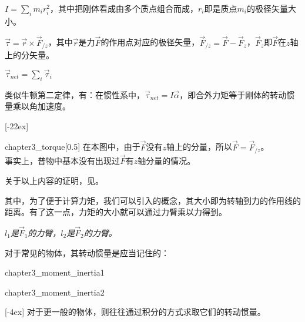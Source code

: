 \begin{Itemize}
	\item {} $\displaystyle I=\sum_{i}m_ir_i^2$，其中把刚体看成由多个质点组合而成，$r_i$即是质点$m_i$的极径矢量大小。
	
	\item {} $\vec{\tau}=\vec{r}\times\vec{F}_{/z}$，其中$\vec{r}$是力$\vec{F}$的作用点对应的极径矢量，$\vec{F}_{/z}=\vec{F}-\vec{F}_z$，$\vec{F}_z$即$\vec{F}$在$z$轴上的分矢量\footnotemark。
	\item {} $\displaystyle\vec{\tau}_{net}=\sum_{i}\vec{\tau}_i$
	\item 类似牛顿第二定律，有：在惯性系中，$\vec{\tau}_{net}=I\vec{\alpha}$，即合外力矩等于刚体的转动惯量乘以角加速度。
\end{Itemize}
[-22ex]
\clearpage
\begin{singlefigure}[力矩示意图]{chapter3_torque}[0.5]
	在本图中，由于$\vec{F}$没有$z$轴上的分量，所以$\vec{F}=\vec{F}_{/z}$。\\
	事实上，普物中基本没有出现过$\vec{F}$有$z$轴分量的情况。
\end{singlefigure}
关于以上内容的证明，见。

其中，为了便于计算力矩，我们可以引入的概念，其大小即为转轴到力的作用线的距离。有了这一点，力矩的大小就可以通过力臂乘以力得到。
\begin{center}
	\em $l_1$是$\vec{F}_1$的力臂，$l_2$是$\vec{F}_2$的力臂。
\end{center}

对于常见的物体，其转动惯量是应当记住的：
\begin{singlefigure}{chapter3_moment_inertia1}
\end{singlefigure}
\vspace*{-2ex}
\begin{singlefigure}[常见物体的转动惯量]{chapter3_moment_inertia2}
\end{singlefigure}
[-4ex]
对于更一般的物体，则往往通过积分的方式求取它们的转动惯量。
